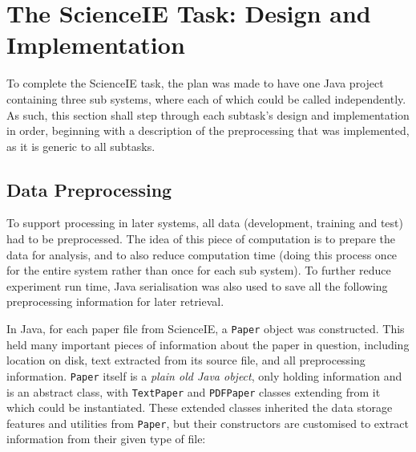 \section{The ScienceIE Task: Design and Implementation}

To complete the ScienceIE task, the plan was made to have one Java project containing three sub systems, where each of which could be called independently. As such, this section shall step through each subtask's design and implementation in order, beginning with a description of the preprocessing that was implemented, as it is generic to all subtasks.

\subsection{Data Preprocessing}
To support processing in later systems, all data (development, training and test) had to be preprocessed. The idea of this piece of computation is to prepare the data for analysis, and to also reduce computation time (doing this process once for the entire system rather than once for each sub system). To further reduce experiment run time, Java serialisation was also used to save all the following preprocessing information for later retrieval.

In Java, for each paper file from ScienceIE, a \texttt{Paper} object was constructed. This held many important pieces of information about the paper in question, including location on disk, text extracted from its source file, and all preprocessing information. \texttt{Paper} itself is a \textit{plain old Java object}, only holding information and is an abstract class, with \texttt{TextPaper} and \texttt{PDFPaper} classes extending from it which could be instantiated. These extended classes inherited the data storage features and utilities from \texttt{Paper}, but their constructors are customised to extract information from their given type of file:


